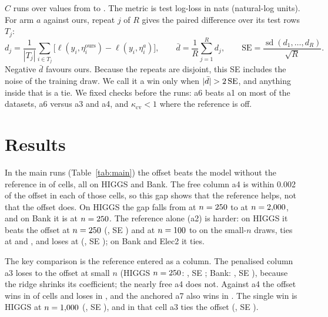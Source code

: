 \documentclass{article}
\begin{document}
$C$ runs over \nCGridSize{} values from \nCGridLo{} to \nCGridHi.
The metric is test log-loss in nats (natural-log units). For arm $a$ against ours, repeat $j$ of $R$ gives the paired difference over its test rows $T_j$:
\begin{equation}
d_j = \frac{1}{|T_j|}\sum_{i \in T_j} \bigl[\ell(y_i, \eta^{\mathrm{ours}}_i) - \ell(y_i, \eta^{a}_i)\bigr],
\qquad
\bar d = \frac{1}{R}\sum_{j=1}^{R} d_j,
\qquad
\mathrm{SE} = \frac{\operatorname{sd}(d_1,\dots,d_R)}{\sqrt{R}} .
\label{eq:paired}
\end{equation}
Negative $\bar d$ favours ours. Because the repeats are disjoint, this SE includes the noise of the training draw.
We call it a win only when $|\bar d| > 2\,\mathrm{SE}$, and anything inside that is a tie.
We fixed \nPreregChecks{} checks before the runs: a6 beats a1 on most of the \nDatasets{} datasets, a6 versus a3 and a4, and $\kappa_{\mathrm{cv}} < 1$ where the reference is off.

\section{Results}
\label{sec:results}

In the main runs (Table~\ref{tab:main}) the offset beats the model without the reference in \nBeatKcvPlain{} of \nMainCells{} cells, all on HIGGS and Bank.
The free column a4 is within 0.002 of the offset in each of those cells, so this gap shows that the reference helps, not that the offset does.
On HIGGS the gap falls from \nHgTwoFiftyDKcvPlain{} at $n = 250$ to \nHgTwoKDKcvPlain{} at $n = 2{,}000$, and on Bank it is \nBkTwoFiftyDKcvPlain{} at $n = 250$.
The reference alone (a2) is harder: on HIGGS it beats the offset at $n = 250$ (\nHgTwoFiftyDKcvRef, SE \nHgTwoFiftyDKcvRefSe) and at $n = 100$ to \nSizeTwoFifty{} on the small-$n$ draws, ties at \nSizeFiveHund{} and \nSizeOneK, and loses at \nSizeTwoK{} (\nHgTwoKDKcvRef, SE \nHgTwoKDKcvRefSe); on Bank and Elec2 it ties.

The key comparison is the reference entered as a column.
The penalised column a3 loses to the offset at small $n$ (HIGGS $n = 250$: \nHgTwoFiftyDKcvFeat, SE \nHgTwoFiftyDKcvFeatSe; Bank: \nBkTwoFiftyDKcvFeat, SE \nBkTwoFiftyDKcvFeatSe), because the ridge shrinks its coefficient; the nearly free a4 does not.
Against a4 the offset wins in \nBeatKcvFree{} of \nMainCells{} cells and loses in \nLoseKcvFree, and the anchored a7 also wins in \nBeatAnchFree.
The single win is HIGGS at $n = 1{,}000$ (\nHgOneKDKcvFree, SE \nHgOneKDKcvFreeSe), and in that cell a3 ties the offset (\nHgOneKDKcvFeat, SE \nHgOneKDKcvFeatSe).
\end{document}
